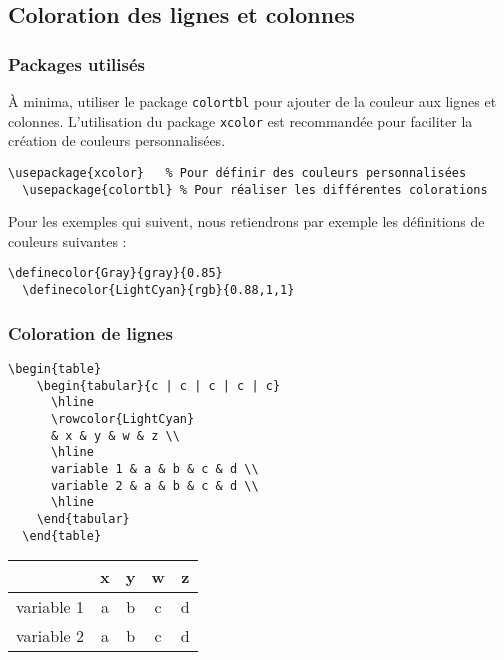 \subsection{Coloration des lignes et colonnes}
\subsubsection{Packages utilisés}
À minima, utiliser le package \texttt{colortbl} pour ajouter de la couleur aux lignes et colonnes. L'utilisation du package \texttt{xcolor} est recommandée pour faciliter la création de couleurs personnalisées.

\begin{lstlisting}[language={[LaTeX]TeX}]
  \usepackage{xcolor}   % Pour définir des couleurs personnalisées
  \usepackage{colortbl} % Pour réaliser les différentes colorations
\end{lstlisting}

Pour les exemples qui suivent, nous retiendrons par exemple les définitions de couleurs suivantes :

\begin{lstlisting}[language={[LaTeX]TeX}]
  \definecolor{Gray}{gray}{0.85}
  \definecolor{LightCyan}{rgb}{0.88,1,1}
\end{lstlisting}

\subsubsection{Coloration de lignes}
\noindent
\begin{minipage}{.65\textwidth}
\begin{lstlisting}[language={[LaTeX]TeX}]  
  \begin{table}
    \begin{tabular}{c | c | c | c | c}
      \hline
      \rowcolor{LightCyan}
      & x & y & w & z \\
      \hline
      variable 1 & a & b & c & d \\
      variable 2 & a & b & c & d \\
      \hline
    \end{tabular}
  \end{table}
\end{lstlisting}
\end{minipage}%
\hfill%
\begin{tabular}{c | c | c | c | c}
  \hline
  \rowcolor{LightCyan}
  & x & y & w & z \\
  \hline
  variable 1 & a & b & c & d \\
  variable 2 & a & b & c & d \\ \hline
\end{tabular}
\hfill\rule{0pt}{0pt}

